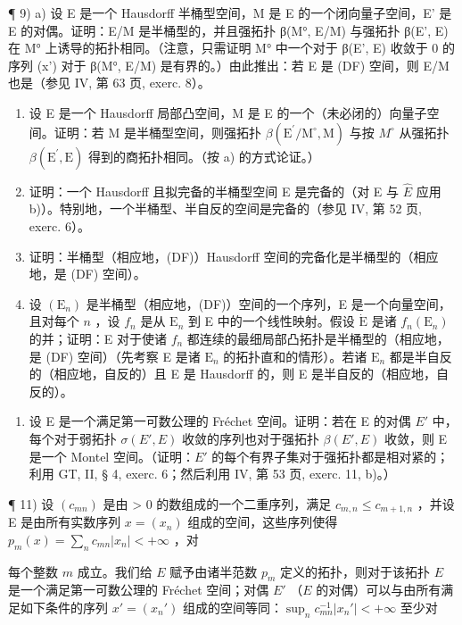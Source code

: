 ¶ 9) a) 设 E 是一个 Hausdorff 半桶型空间，M 是 E 的一个闭向量子空间，E' 是 E 的对偶。证明：E/M 是半桶型的，并且强拓扑 β(M°, E/M) 与强拓扑 β(E', E) 在 M° 上诱导的拓扑相同。（注意，只需证明 M° 中一个对于 β(E', E) 收敛于 0 的序列 (x') 对于 β(M°, E/M) 是有界的。）由此推出：若 E 是 (DF) 空间，则 E/M 也是（参见 IV, 第 63 页, exerc. 8）。

\begin{enumerate}
\def\labelenumi{\alph{enumi})}
\setcounter{enumi}{1}
\item
  设 E 是一个 Hausdorff 局部凸空间，M 是 E 的一个（未必闭的）向量子空间。证明：若 M 是半桶型空间，则强拓扑 \(\beta(\mathrm{E}^{\prime}/\mathrm{M}^{\circ}, \mathrm{M})\) 与按 \(M^{\circ}\) 从强拓扑 \(\beta(\mathrm{E}^{\prime}, \mathrm{E})\) 得到的商拓扑相同。（按 a) 的方式论证。）
\item
  证明：一个 Hausdorff 且拟完备的半桶型空间 E 是完备的（对 E 与 \(\hat{E}\) 应用 b)）。特别地，一个半桶型、半自反的空间是完备的（参见 IV, 第 52 页, exerc. 6）。
\item
  证明：半桶型（相应地，(DF)）Hausdorff 空间的完备化是半桶型的（相应地，是 (DF) 空间）。
\item
  设 \((\mathrm{E}_n)\) 是半桶型（相应地，(DF)）空间的一个序列，E 是一个向量空间，且对每个 \(n\) ，设 \(f_n\) 是从 \(\mathrm{E}_n\) 到 E 中的一个线性映射。假设 \(\dot{\mathrm{E}}\) 是诸 \(f_n(\mathrm{E}_n)\) 的并；证明：E 对于使诸 \(f_n\) 都连续的最细局部凸拓扑是半桶型的（相应地，是 (DF) 空间）（先考察 E 是诸 \(\mathrm{E}_n\) 的拓扑直和的情形）。若诸 \(\mathrm{E}_n\) 都是半自反的（相应地，自反的）且 E 是 Hausdorff 的，则 E 是半自反的（相应地，自反的）。
\end{enumerate}

\begin{enumerate}
\def\labelenumi{\arabic{enumi})}
\setcounter{enumi}{9}
\tightlist
\item
  设 E 是一个满足第一可数公理的 Fréchet 空间。证明：若在 E 的对偶 \(E'\) 中，每个对于弱拓扑 \(\sigma(E', E)\) 收敛的序列也对于强拓扑 \(\beta(E', E)\) 收敛，则 E 是一个 Montel 空间。（证明：\(E'\) 的每个有界子集对于强拓扑都是相对紧的；利用 GT, II, § 4, exerc. 6；然后利用 IV, 第 53 页, exerc. 11, b)。）
\end{enumerate}

¶ 11) 设 \((c_{mn})\) 是由 \textgreater{} 0 的数组成的一个二重序列，满足 \(c_{m,n} \leqslant c_{m+1,n}\) ，并设 E 是由所有实数序列 \(x = (x_n)\) 组成的空间，这些序列使得 \(p_m(x) = \sum_n c_{mn} |x_n| < +\infty\) ，对

每个整数 \(m\) 成立。我们给 \(E\) 赋予由诸半范数 \(p_m\) 定义的拓扑，则对于该拓扑 \(E\) 是一个满足第一可数公理的 Fréchet 空间；对偶 \(E'\) （\(E\) 的对偶）可以与由所有满足如下条件的序列 \(x' = (x_n')\) 组成的空间等同：\(\sup_{n} c_{mn}^{-1} |x_n'| < +\infty\) 至少对

